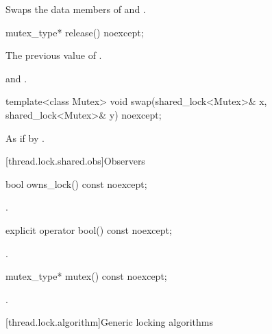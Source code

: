 \begin{itemdescr}
\pnum
\effects
Swaps the data members of  and .
\end{itemdescr}

%
\begin{itemdecl}
mutex_type* release() noexcept;
\end{itemdecl}

\begin{itemdescr}
\pnum
\returns
The previous value of .

\pnum
\ensures
{} and .
\end{itemdescr}

%
\begin{itemdecl}
template<class Mutex>
  void swap(shared_lock<Mutex>& x, shared_lock<Mutex>& y) noexcept;
\end{itemdecl}

\begin{itemdescr}
\pnum
\effects
As if by .
\end{itemdescr}

[thread.lock.shared.obs]{Observers}

%
\begin{itemdecl}
bool owns_lock() const noexcept;
\end{itemdecl}

\begin{itemdescr}
\pnum
\returns
{}.
\end{itemdescr}

%
\begin{itemdecl}
explicit operator bool() const noexcept;
\end{itemdecl}

\begin{itemdescr}
\pnum
\returns
{}.
\end{itemdescr}

%
\begin{itemdecl}
mutex_type* mutex() const noexcept;
\end{itemdecl}

\begin{itemdescr}
\pnum
\returns
{}.
\end{itemdescr}

[thread.lock.algorithm]{Generic locking algorithms}

